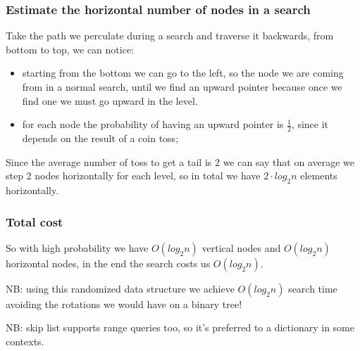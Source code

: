\subsubsection{Estimate the horizontal number of nodes in a search}
Take the path we perculate during a search and traverse it backwards, from bottom to top, we can notice:
\begin{itemize}
    \item starting from the bottom we can go to the left, so the node we are coming from in a normal search, until we find an upward pointer because once we find one we must go upward in the level.

    \item for each node the probability of having an upward pointer is $\frac{1}{2}$, since it depends on the result of a coin toss;
\end{itemize}
Since the average number of toss to get a tail is 2 we can say that on average we step 2 nodes horizontally for each level, so in total we have $2 \cdot log_2 n$ elements horizontally.

\subsubsection{Total cost}
So with high probability we have $O(log_2 n)$ vertical nodes and $O(log_2 n)$ horizontal nodes, in the end the search costs us $O(log_2 n)$.

NB: using this randomized data structure we achieve $O(log_2 n)$ search time avoiding the rotations we would have on a binary tree!

NB: skip list supports range queries too, so it's preferred to a dictionary in some contexts.